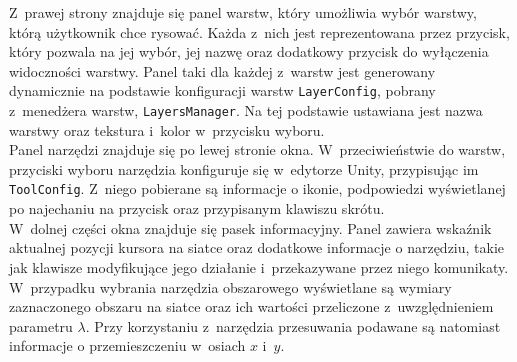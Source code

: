 Z~prawej strony znajduje się panel warstw, który umożliwia wybór warstwy, którą użytkownik chce rysować.
Każda z~nich jest reprezentowana przez przycisk, który pozwala na jej wybór,
jej nazwę oraz dodatkowy przycisk do wyłączenia widoczności warstwy.
Panel taki dla każdej z~warstw jest generowany dynamicznie na podstawie konfiguracji warstw \texttt{LayerConfig},
pobrany z~menedżera warstw, \texttt{LayersManager}.
Na tej podstawie ustawiana jest nazwa warstwy oraz tekstura i~kolor w~przycisku wyboru.\\
Panel narzędzi znajduje się po lewej stronie okna.
W~przeciwieństwie do warstw, przyciski wyboru narzędzia konfiguruje się w~edytorze Unity,
przypisując im \texttt{ToolConfig}.
Z~niego pobierane są informacje o ikonie,
podpowiedzi wyświetlanej po najechaniu na przycisk oraz przypisanym klawiszu skrótu.\\
\indent W~dolnej części okna znajduje się pasek informacyjny.
Panel zawiera wskaźnik aktualnej pozycji kursora na siatce oraz dodatkowe informacje o narzędziu,
takie jak klawisze modyfikujące jego działanie i~przekazywane przez niego komunikaty.
W~przypadku wybrania narzędzia obszarowego wyświetlane są wymiary zaznaczonego obszaru na siatce
oraz ich wartości przeliczone z~uwzględnieniem parametru $\lambda$.
Przy korzystaniu z~narzędzia przesuwania podawane są natomiast informacje o przemieszczeniu w~osiach $x$ i~$y$.
